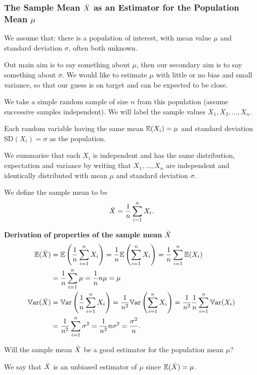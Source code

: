 \documentclass[10pt, a4paper]{article}
\begin{document}
\subsubsection{The Sample Mean \texorpdfstring{$\Bar{X}$}{} as an Estimator for the Population Mean \texorpdfstring{$\mu$}{}}

We assume that:
there is a population of interest,
with mean value $\mu$ and standard deviation $\sigma$,
often both unknown.

Out main aim is to say something about $\mu$,
then our secondary aim is to say something about $\sigma$.
We would like to estimate $\mu$ with little or no bias and small variance,
so that our guess is on target and can be expected to be close.

We take a simple random sample of size $n$ from this population
(assume successive samples independent).
We will label the sample values $X_1, X_2, \dotsc, X_n$.

Each random variable having the same mean $\mathbb{E}(X_i) = \mu$ and standard deviation $\mathrm{SD}(X_i) = \sigma$ as the population.

We summarise that each $X_i$ is independent and has the same distribution,
expectation and variance by writing that $X_1, \dotsc, X_n$ are independent and identically distributed with mean $\mu$ and standard deviation $\sigma$.

We define the sample mean to be
\[
\Bar{X} = \frac{1}{n}\sum_{i = 1}^{n}X_i.
\]

\textbf{Derivation of properties of the sample mean $\Bar{X}$}
\begin{align*}
    \mathbb{E}(\Bar{X}) &= \mathbb{E}\left(\frac{1}{n}\sum_{i = 1}^{n}X_i\right) = \frac{1}{n}\mathbb{E}\left(\sum_{i = 1}^{n}X_i\right) = \frac{1}{n}\sum_{i = 1}^{n}\mathbb{E}(X_i) \\
    &= \frac{1}{n}\sum_{i = 1}^{n}\mu = \frac{1}{n}n\mu = \mu \\
    \mathbb{V}\mathrm{ar}(\Bar{X}) &= \mathbb{V}\mathrm{ar}\left(\frac{1}{n}\sum_{i = 1}^{n}X_i\right) = \frac{1}{n ^ 2}\mathbb{V}\mathrm{ar}\left(\sum_{i = 1}^{n}X_i\right) = \frac{1}{n ^ 2}\frac{1}{n}\sum_{i = 1}^{n}\mathbb{V}\mathrm{ar}(X_i) \\
    &= \frac{1}{n ^ 2}\sum_{i = 1}^{n}\sigma ^ 2 = \frac{1}{n ^ 2}n\sigma ^ 2 = \frac{\sigma ^ 2}{n}.
\end{align*}

Will the sample mean $\Bar{X}$ be a good estimator for the population mean $\mu$?

We say that $\Bar{X}$ is an unbiased estimator of $\mu$ since $\mathbb{E}(\Bar{X}) = \mu$.
\end{document}
